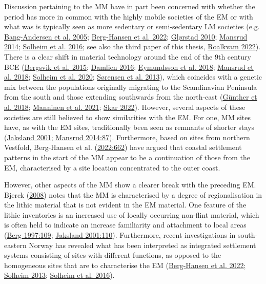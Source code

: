 \documentclass[
  a4paper,
  oneside]{uiophdthesis}
\begin{document}
Discussion pertaining to the MM have in part been concerned with whether the period has more in common with the highly mobile societies of the EM or with what was is typically seen as more sedentary or semi-sedentary LM societies (e.g. \protect\hyperlink{ref-bang-andersen2005}{Bang-Andersen et al. 2005}; \protect\hyperlink{ref-berg-hansen2022}{Berg-Hansen et al. 2022}; \protect\hyperlink{ref-glorstad2010}{Glørstad 2010}; \protect\hyperlink{ref-mansrud2014}{Mansrud 2014}; \protect\hyperlink{ref-solheim2016}{Solheim et al. 2016}; see also the third paper of this thesis, \protect\hyperlink{ref-roalkvam2022}{Roalkvam 2022}). There is a clear shift in material technology around the end of the 9th century BCE (\protect\hyperlink{ref-bergsvik2015}{Bergsvik et al. 2015}; \protect\hyperlink{ref-damlien2016}{Damlien 2016}; \protect\hyperlink{ref-eymundsson2018}{Eymundsson et al. 2018}; \protect\hyperlink{ref-mansrud2018}{Mansrud et al. 2018}; \protect\hyperlink{ref-solheim2020a}{Solheim et al. 2020}; \protect\hyperlink{ref-suxf8rensen2013}{Sørensen et al. 2013}), which coincides with a genetic mix between the populations originally migrating to the Scandinavian Peninsula from the south and those extending southwards from the north-east (\protect\hyperlink{ref-gunther2018}{Günther et al. 2018}; \protect\hyperlink{ref-manninen2021}{Manninen et al. 2021}; \protect\hyperlink{ref-skar2022}{Skar 2022}). However, several aspects of these societies are still believed to show similarities with the EM. For one, MM sites have, as with the EM sites, traditionally been seen as remnants of shorter stays (\protect\hyperlink{ref-jaksland2001}{Jaksland 2001}; \protect\hyperlink{ref-mansrud2014}{Mansrud 2014:87}). Furthermore, based on sites from northern Vestfold, Berg-Hansen et al. (\protect\hyperlink{ref-berg-hansen2022}{2022:662}) have argued that coastal settlement patterns in the start of the MM appear to be a continuation of those from the EM, characterised by a site location concentrated to the outer coast.

However, other aspects of the MM show a clearer break with the preceding EM. Bjerck (\protect\hyperlink{ref-bjerck2008}{2008}) notes that the MM is characterised by a degree of regionalisation in the lithic material that is not evident in the EM material. One feature of the lithic inventories is an increased use of locally occurring non-flint material, which is often held to indicate an increase familiarity and attachment to local areas (\protect\hyperlink{ref-berg1997}{Berg 1997:109}; \protect\hyperlink{ref-jaksland2001}{Jaksland 2001:110}). Furthermore, recent investigations in south-eastern Norway has revealed what has been interpreted as integrated settlement systems consisting of sites with different functions, as opposed to the homogeneous sites that are to characterise the EM (\protect\hyperlink{ref-berg-hansen2022}{Berg-Hansen et al. 2022}; \protect\hyperlink{ref-solheim2013b}{Solheim 2013}; \protect\hyperlink{ref-solheim2016}{Solheim et al. 2016}).
\end{document}
